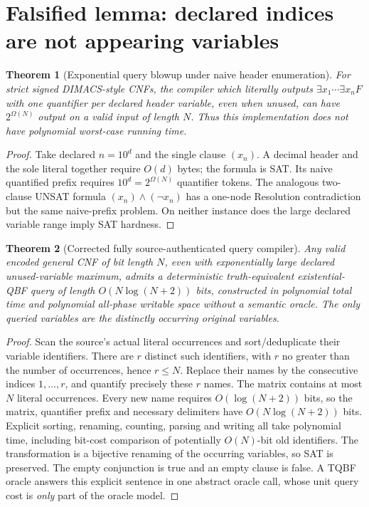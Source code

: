 \documentclass[11pt]{article}
\newtheorem{theorem}{Theorem}
\begin{document}
\section*{Falsified lemma: declared indices are not appearing variables}
\begin{theorem}[Exponential query blowup under naive header enumeration]
For strict signed DIMACS-style CNFs, the compiler which literally outputs $\exists x_1\cdots\exists x_n F$ with one quantifier per \emph{declared header variable}, even when unused, can have $2^{\Omega(N)}$ output on a valid input of length $N$. Thus this implementation does not have polynomial worst-case running time.
\end{theorem}
\begin{proof}
Take declared $n=10^d$ and the single clause $(x_n)$. A decimal header and the sole literal together require $O(d)$ bytes; the formula is SAT. Its naive quantified prefix requires $10^d=2^{\Omega(N)}$ quantifier tokens. The analogous two-clause UNSAT formula $(x_n)\land(\neg x_n)$ has a one-node Resolution contradiction but the same naive-prefix problem. On neither instance does the large declared variable range imply SAT hardness.
\end{proof}

\begin{theorem}[Corrected fully source-authenticated query compiler]
Any valid encoded general CNF of bit length $N$, even with exponentially large declared unused-variable maximum, admits a deterministic truth-equivalent existential-QBF query of length $O(N\log(N+2))$ bits, constructed in polynomial total time and polynomial all-phase writable space without a semantic oracle. The only queried variables are the distinctly occurring original variables.
\end{theorem}
\begin{proof}
Scan the source's actual literal occurrences and sort/deduplicate their variable identifiers. There are $r$ distinct such identifiers, with $r$ no greater than the number of occurrences, hence $r\le N$. Replace their names by the consecutive indices $1,\ldots,r$, and quantify precisely these $r$ names. The matrix contains at most $N$ literal occurrences. Every new name requires $O(\log(N+2))$ bits, so the matrix, quantifier prefix and necessary delimiters have $O(N\log(N+2))$ bits. Explicit sorting, renaming, counting, parsing and writing all take polynomial time, including bit-cost comparison of potentially $O(N)$-bit old identifiers. The transformation is a bijective renaming of the occurring variables, so SAT is preserved. The empty conjunction is true and an empty clause is false. A TQBF oracle answers this explicit sentence in one abstract oracle call, whose unit query cost is \emph{only} part of the oracle model.
\end{proof}
\end{document}
